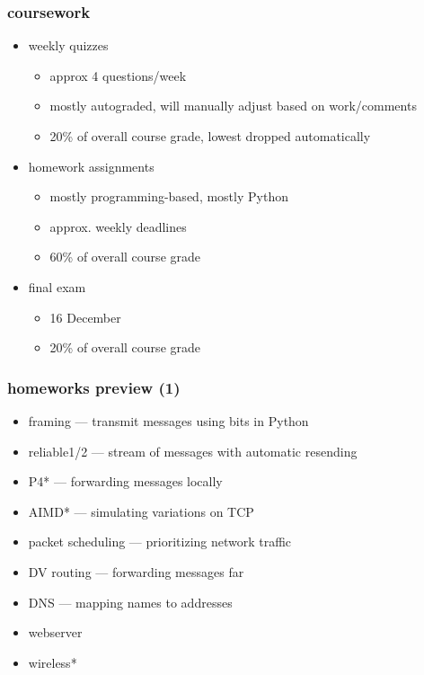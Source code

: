 \begin{frame}\frametitle{coursework}
    \begin{itemize}
    \item weekly quizzes
        \begin{itemize}
        \item approx 4 questions/week
        \item mostly autograded, will manually adjust based on work/comments
        \item 20\% of overall course grade, lowest dropped automatically
        \end{itemize}
    \item homework assignments
        \begin{itemize}
        \item mostly programming-based, mostly Python
        \item approx. weekly deadlines
        \item 60\% of overall course grade
        \end{itemize}
    \item final exam
        \begin{itemize}
        \item 16 December
        \item 20\% of overall course grade
        \end{itemize}
    \end{itemize}
\end{frame}

\begin{frame}\frametitle{homeworks preview (1)}
    \begin{itemize}
    \item framing --- transmit messages using bits in Python
    \item reliable1/2 --- stream of messages with automatic resending
    \item P4* --- forwarding messages locally
    \item AIMD* --- simulating variations on TCP
    \item packet scheduling --- prioritizing network traffic
    \item DV routing --- forwarding messages far
    \item DNS --- mapping names to addresses
    \item webserver
    \item wireless*
    \end{itemize}
\end{frame}

